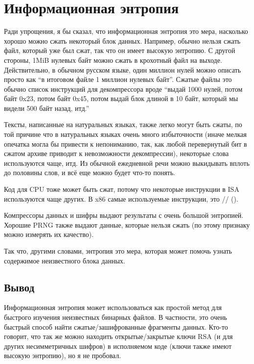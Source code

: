 \section{Информационная энтропия}
\label{entropy}

Ради упрощения, я бы сказал, что информационная энтропия это мера, насколько хорошо можно сжать
некоторый блок данных.
Например, обычно нельзя сжать файл, который уже был сжат, так что он имеет высокую энтропию.
С другой стороны, 1MiB нулевых байт можно сжать в крохотный файл на выходе.
Действительно, в обычном русском языке, один миллион нулей можно описать просто как
``в итоговом файле 1 миллион нулевых байт''.
Сжатые файлы это обычно список инструкций для декомпрессора вроде
``выдай 1000 нулей, потом байт 0x23, потом байт 0x45, потом выдай блок длиной в 10 байт, который мы видели 500 байт назад,
итд.''

Тексты, написанные на натуральных языках, также легко могут быть сжаты, по той причине что в натуральных языках очень
много избыточности (иначе мелкая опечатка могла бы привести к непониманию, так, как любой перевернутый бит в сжатом
архиве приводит к невозможности декомпрессии),
некоторые слова используются чаще, итд.
Из обычной ежедневной речи можно выкидывать вплоть до половины слов, и всё еще можно будет что-то понять.

Код для CPU тоже может быть сжат, потому что некоторые инструкции в \ac{ISA} используются чаще других.
В x86 самые используемые инструкции, это // ().

Компрессоры данных и шифры выдают результаты с очень большой энтропией.
Хорошие \ac{PRNG} также выдают данные, которые нельзя сжать
(по этому признаку можно измерять их качество).

Так что, другими словами, энтропия это мера, которая может помочь узнать содержимое неизвестного блока данных.



\subsection{Вывод}

Информационная энтропия может использоваться как простой метод для быстрого изучения неизвестных бинарных файлов.
В частности, это очень быстрый способ найти сжатые/зашифрованные фрагменты данных.
Кто-то говорит, что так же можно находить открытые/закрытые ключи \ac{RSA} (и для других несимметричных шифров)
в исполняемом коде (ключи также имеют  высокую энтропию), но я не пробовал.

